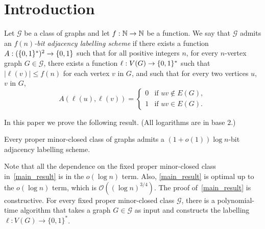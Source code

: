 \documentclass{patmorin}
\renewcommand{\leq}{\leqslant}
\newcommand{\david}[1]{\noindent{\color{orange} DW: #1}}
\newcommand{\pat}[1]{\noindent\textcolor{Magenta}{PaMo: #1}}
\newcommand{\defin}[1]{\emph{\textcolor{brightmaroon}{#1}}}
\newcommand{\calG}{\mathcal{G}}
\newcommand{\Oh}{\mathcal{O}}
\DeclarePairedDelimiter{\set}{\{}{\}}
\begin{document}
\newpage
  \section{Introduction}
Let $\calG$ be a class of graphs and let $f:\mathbb{N}\to\mathbb{N}$ be a function.
We say that $\calG$ admits an \defin{$f(n)$-bit adjacency labelling scheme} if there exists a function $A:(\set{0,1}^*)^2\to\set{0,1}$ such that for all positive integers $n$, for every $n$-vertex graph $G\in\calG$, there exists a function $\ell: V(G)\to\set{0,1}^*$ such that
$|\ell(v)|\leq f(n)$ for each vertex $v$ in $G$, and such that
for every two vertices $u$, $v$ in $G$,
\[
A(\ell(u),\ell(v))=\begin{cases}
0&\textrm{if $uv\notin E(G)$},\\
1&\textrm{if $uv\in E(G)$}.
\end{cases}
\]

In this paper we prove the following result. (All logarithms are in base $2$.)

\begin{thm}
\label{main_result}
Every proper minor-closed class of graphs admits
a $(1+o(1))\log n$-bit adjacency labelling scheme.
\end{thm}


Note that all the dependence on the fixed proper minor-closed class in~\cref{main_result} is in the $o(\log n)$ term. Also, \cref{main_result} is optimal up to the $o(\log n)$ term,
which is $\Oh\left((\log n)^{3/4}\right)$.
The proof of~\cref{main_result} is constructive. For every fixed proper minor-closed class $\calG$, there is a polynomial-time algorithm that takes a graph $G\in\calG$ as input and constructs the labelling $\ell:V(G)\to\{0,1\}^*$.

\end{document}
